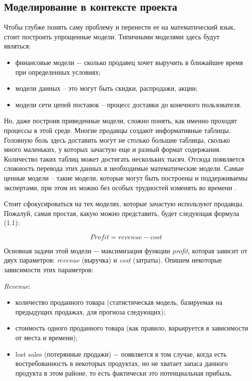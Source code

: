 \subsection{Моделирование в контексте проекта}
\label{sec:domain:modelling}

Чтобы глубже понять саму проблему и перенести ее на математический язык, стоит построить упрощенные модели. Типичными моделями здесь будут являться:
\begin{itemize}
  \item финансовые модели ​− сколько продавец хочет выручить в ближайшее время при определенных условиях;
  \item модели данных – это могут быть скидки, распродажи, акции;
  \item модели сети цепей поставок – процесс доставки до конечного пользователя.
\end{itemize}

Но, даже построив приведенные модели, сложно понять, как именно проходят процессы в этой среде. Многие продавцы создают информативные таблицы. Головную боль здесь доставить могут не столько большие таблицы, сколько много маленьких, у которых зачастую еще и разный формат содержания. Количество таких таблиц может достигать нескольких тысяч. Отсюда появляется сложность перевода этих данных в необходимые математические модели. Самые ценные модели – такие модели, которые могут быть построены и поддерживаемы экспертами, при этом их можно без особых трудностей изменять во времени \cite{kurt_lecture}.

Стоит сфокусироваться на тех моделях, которые зачастую используют продавцы. Пожалуй, самая простая, какую можно представить, будет следующая формула (1.1):

\begin{equation}
  Profit = revenue - cost
\end{equation}

Основная задачи этой модели ​− максимизация функции \emph{profit}, которая зависит от двух параметров: \emph{revenue} (выручка) и \emph{cost} (затраты). Опишем некоторые зависимости этих параметров:

\emph{Revenue}:
\begin{itemize}
  \item количество проданного товара (статистическая модель, базируемая на предыдущих продажах, для прогноза следующих);
  \item стоимость одного проданного товара (как правило, варьируется в зависимости от места и времени);
  \item lost sales (потерянные продажи) ​− появляется в том случае, когда есть востребованность в некоторых продуктах, но не хватает запаса данного продукта в этом районе, то есть фактически это потенциальная прибыль.
\end{itemize}


